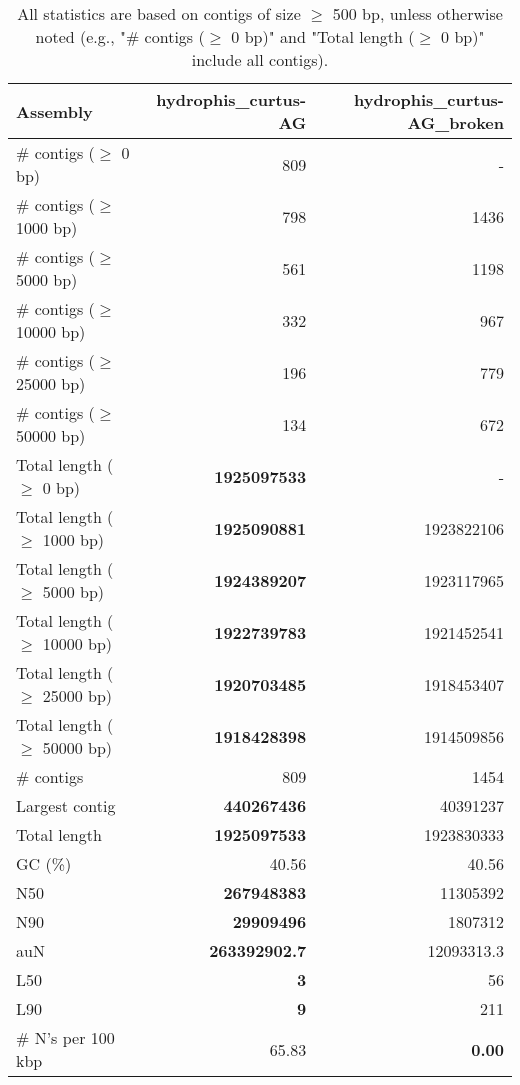 \documentclass[12pt,a4paper]{article}
\begin{document}
\begin{table}[ht]
\begin{center}
\caption{All statistics are based on contigs of size $\geq$ 500 bp, unless otherwise noted (e.g., "\# contigs ($\geq$ 0 bp)" and "Total length ($\geq$ 0 bp)" include all contigs).}
\begin{tabular}{|l*{2}{|r}|}
\hline
Assembly & hydrophis\_curtus-AG & hydrophis\_curtus-AG\_broken \\ \hline
\# contigs ($\geq$ 0 bp) & 809 & - \\ \hline
\# contigs ($\geq$ 1000 bp) & 798 & 1436 \\ \hline
\# contigs ($\geq$ 5000 bp) & 561 & 1198 \\ \hline
\# contigs ($\geq$ 10000 bp) & 332 & 967 \\ \hline
\# contigs ($\geq$ 25000 bp) & 196 & 779 \\ \hline
\# contigs ($\geq$ 50000 bp) & 134 & 672 \\ \hline
Total length ($\geq$ 0 bp) & {\bf 1925097533} & - \\ \hline
Total length ($\geq$ 1000 bp) & {\bf 1925090881} & 1923822106 \\ \hline
Total length ($\geq$ 5000 bp) & {\bf 1924389207} & 1923117965 \\ \hline
Total length ($\geq$ 10000 bp) & {\bf 1922739783} & 1921452541 \\ \hline
Total length ($\geq$ 25000 bp) & {\bf 1920703485} & 1918453407 \\ \hline
Total length ($\geq$ 50000 bp) & {\bf 1918428398} & 1914509856 \\ \hline
\# contigs & 809 & 1454 \\ \hline
Largest contig & {\bf 440267436} & 40391237 \\ \hline
Total length & {\bf 1925097533} & 1923830333 \\ \hline
GC (\%) & 40.56 & 40.56 \\ \hline
N50 & {\bf 267948383} & 11305392 \\ \hline
N90 & {\bf 29909496} & 1807312 \\ \hline
auN & {\bf 263392902.7} & 12093313.3 \\ \hline
L50 & {\bf 3} & 56 \\ \hline
L90 & {\bf 9} & 211 \\ \hline
\# N's per 100 kbp & 65.83 & {\bf 0.00} \\ \hline
\end{tabular}
\end{center}
\end{table}
\end{document}
